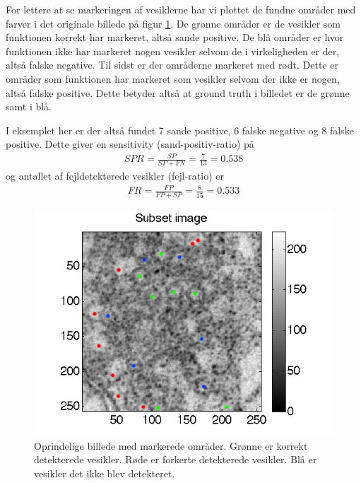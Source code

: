 For lettere at se markeringen af vesiklerne har vi plottet de fundne områder med farver i det originale billede på figur \ref{fig:postmethod_conv_photoshop}. De grønne områder er de vesikler som funktionen korrekt har markeret, altså sande positive. De blå områder er hvor funktionen ikke har markeret nogen vesikler selvom de i virkeligheden er der, altså falske negative. Til sidst er der områderne markeret med rødt. Dette er områder som funktionen har markeret som vesikler selvom der ikke er nogen, altså falske positive. Dette betyder altså at ground truth i billedet er de grønne samt i blå.

I eksemplet her er der altså fundet 7 sande positive, 6 falske negative og 8 falske positive. Dette giver en sensitivity (sand-positiv-ratio) på
\begin{align}
	SPR = \frac{SP}{SP+FN} = \frac{7}{13} = 0.538
\end{align}
og antallet af fejldetekterede vesikler (fejl-ratio) er
\begin{align}
	FR = \frac{FP}{FP+SP} = \frac{8}{15} = 0.533
\end{align}

\begin{figure}[H]
		\centering
		\includegraphics[scale=1]{files/postmethod/img/conv_5.png}
	\caption{Oprindelige billede med markerede områder. Grønne er korrekt detekterede vesikler. Røde er forkerte detekterede vesikler. Blå er vesikler det ikke blev detekteret.\label{fig:postmethod_conv_photoshop}}
\end{figure}

